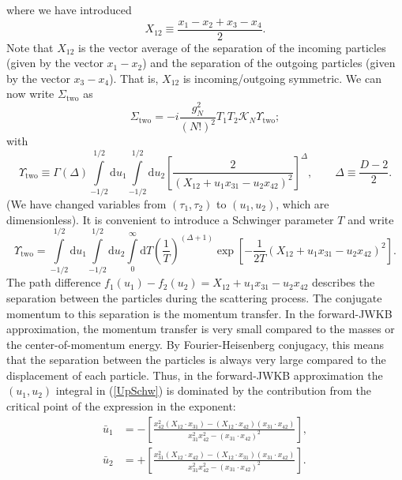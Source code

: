 where we have introduced
\begin{equation}
	X_{1 2} \equiv \frac{x_{1} - x_{2} + x_{3} - x_{4}}{2}.
\end{equation}
Note that $X_{1 2}$ is the vector average of the separation of the incoming particles (given by the vector $x_{1} - x_{2}$) and the separation of the outgoing particles (given by the vector $x_{3} - x_{4}$). That is, $X_{12}$ is incoming/outgoing symmetric. We can now write $\Sigma_{\text{two}}$ as
\begin{equation}
	\Sigma_{\text{two}} = -i\frac{g_{N}^{2}}{(N!)^{2}} T_{1} T_{2} \mathcal{K}_{N} \Upsilon_{\text{two}};
\end{equation}
with
\begin{equation}
	\Upsilon_{\text{two}} \equiv \Gamma(\Delta) \int\limits_{-1/2}^{1/2}\mathrm{d}u_{1} \int\limits_{-1/2}^{1/2}\mathrm{d}u_{2} \left[ \frac{2}{(X_{1 2} + u_{1} x_{3 1} - u_{2} x_{4 2})^{2}} \right]^{\Delta}, \qquad \Delta \equiv \frac{D - 2}{2}.
\end{equation}
(We have changed variables from $(\tau_{1}, \tau_{2})$ to $(u_{1}, u_{2})$, which are dimensionless). It is convenient to introduce a Schwinger parameter $T$ and write
\begin{equation}
	\Upsilon_{\text{two}} = \int\limits_{-1/2}^{1/2}\mathrm{d}u_{1} \int\limits_{-1/2}^{1/2}\mathrm{d}u_{2} \int\limits_{0}^{\infty}\mathrm{d}T \left( \frac{1}{T} \right)^{(\Delta + 1)} \exp{\left[- \frac{1}{2 T} (X_{1 2} + u_{1} x_{3 1} - u_{2} x_{4 2})^{2} \right]}.
	\label{UpSchw}
\end{equation}
The path difference $f_{1}(u_{1}) - f_{2}(u_{2}) = X_{1 2} + u_{1} x_{3 1} - u_{2} x_{4 2}$ describes the separation between the particles during the scattering process. The conjugate momentum to this separation is the momentum transfer. In the forward-JWKB approximation, the momentum transfer is very small compared to the masses or the center-of-momentum energy. By Fourier-Heisenberg conjugacy, this means that the separation between the particles is always very large compared to the displacement of each particle. Thus, in the forward-JWKB approximation the $(u_{1}, u_{2})$ integral in (\ref{UpSchw}) is dominated by the contribution from the critical point of the expression in the exponent:
\begin{align}
	\bar{u}_{1} &= - \left[ \frac{x_{42}^{2} (X_{12} \cdot x_{31}) - (X_{12} \cdot x_{42})(x_{31} \cdot x_{42})}{x_{31}^{2} x_{42}^{2} - (x_{31} \cdot x_{42})^{2}} \right], \\
	\bar{u}_{2} &= + \left[ \frac{x_{31}^{2} (X_{12} \cdot x_{42}) - (X_{12} \cdot x_{31})(x_{31} \cdot x_{42})}{x_{31}^{2} x_{42}^{2} - (x_{31} \cdot x_{42})^{2}} \right].
\end{align}
